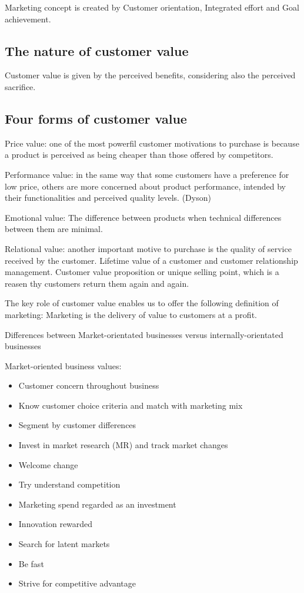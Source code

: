 \documentclass{article}
\begin{document}
Marketing concept is created by Customer orientation, Integrated effort and Goal achievement.

\subsection{The nature of customer value}
Customer value is given by the perceived benefits, considering also the perceived sacrifice.

\subsection{Four forms of customer value}
Price value: one of the most powerfil customer motivations to purchase is because a product is perceived as being cheaper than those offered by competitors.

Performance value: in the same way that some customers have a preference for low price, others are more concerned about product performance, intended by their functionalities and perceived quality levels. (Dyson)

Emotional value: The difference between products when technical differences between them are minimal.

Relational value: another important motive to purchase is the quality of service received by the customer. Lifetime value of a customer and customer relationship management. Customer value proposition or unique selling point, which is a reasen thy customers return them again and again. 

The key role of customer value enables us to offer the following definition of marketing: Marketing is the delivery of value to customers at a profit.

Differences between Market-orientated businesses versus internally-orientated businesses

Market-oriented business values:
\begin{itemize}
    \item Customer concern throughout business
    \item Know customer choice criteria and match with marketing mix
    \item Segment by customer differences
    \item Invest in market research (MR) and track market changes
    \item Welcome change
    \item Try understand competition
    \item Marketing spend regarded as an investment
    \item Innovation rewarded
    \item Search for latent markets
    \item Be fast
    \item Strive for competitive advantage
\end{itemize}
\end{document}
